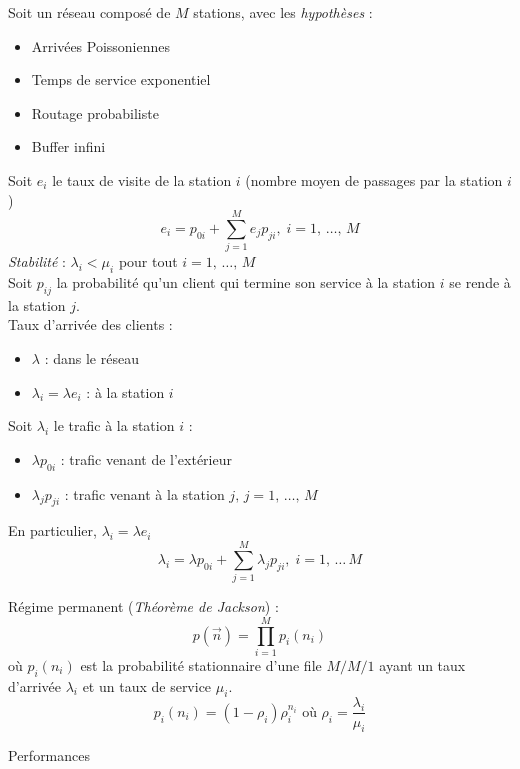 \documentclass[french]{scrartcl}
\begin{document}
\begin{multicols}{3}
{Soit un réseau composé de $M$ stations, avec les \emph{hypothèses} :
\begin{itemize}
	\item Arrivées Poissoniennes
	\item Temps de service exponentiel
	\item Routage probabiliste
	\item Buffer infini
\end{itemize}
Soit $e_i$ le taux de visite de la station $i$ (nombre moyen de passages par la station $i$)
\[
e_i=p_{0i}+\sum_{j=1}^{M}e_j p_{ji},\;i=1,\,\dotsc,\,M
\]
\emph{Stabilité} : $\lambda_i<\mu_i$ pour tout $i=1,\,\dotsc,\,M$\\
Soit $p_{ij}$ la probabilité qu'un client qui termine son service à la station $i$ se rende à la station $j$.\\
Taux d'arrivée des clients :
\begin{itemize}
	\item $\lambda$ : dans le réseau
	\item $\lambda_i=\lambda e_i$ : à la station $i$
\end{itemize}
Soit $\lambda_i$ le trafic à la station $i$ :
\begin{itemize}
	\item $\lambda p_{0i}$ : trafic venant de l'extérieur
	\item $\lambda_j p_{ji}$ : trafic venant à la station $j,\,j=1,\,\dotsc,\,M$
\end{itemize}
En particulier, $\lambda_i=\lambda e_i$
\[
\lambda_i = \lambda p_{0i}+\sum_{j=1}^{M}\lambda_j p_{ji},\;i=1,\,\dotsc\,M
\]

Régime permanent (\emph{Théorème de Jackson}) :
\[
p\left(\vec{n}\right) = \prod_{i=1}^{M}p_{i}(n_i)
\]
où $p_i(n_i)$ est la probabilité stationnaire d'une file $M/M/1$ ayant un taux d'arrivée $\lambda_i$ et un taux de service $\mu_i$.
\[
p_i(n_i) = (1-\rho_i)\rho_i^{n_i}\textrm{ où }\rho_i = \frac{\lambda_i}{\mu_i}
\]
\begin{center}
	\vspace{-10pt}
	\vspace{-10pt}
\end{center}
Performances

}
\end{multicols}
\end{document}
